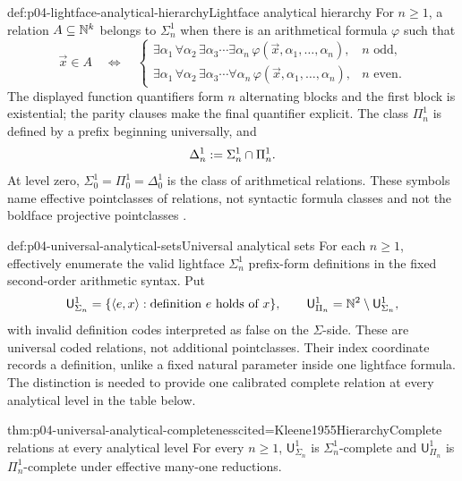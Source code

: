 \begin{hbdefinition}{def:p04-lightface-analytical-hierarchy}{Lightface analytical hierarchy}
For \(n\geq1\), a relation \(A\subseteq\mathbb{N}^k\) belongs to
\(\Sigma^1_n\) when there is an arithmetical formula \(\varphi\) such that
\[
 \vec x\in A\quad\Leftrightarrow\quad
 \begin{cases}
  \exists\alpha_1\,\forall\alpha_2\,\exists\alpha_3\cdots
    \exists\alpha_n\,\varphi(\vec x,\alpha_1,\ldots,\alpha_n),
       & n\text{ odd},\\
  \exists\alpha_1\,\forall\alpha_2\,\exists\alpha_3\cdots
    \forall\alpha_n\,\varphi(\vec x,\alpha_1,\ldots,\alpha_n),
       & n\text{ even}.
 \end{cases}
\]
The displayed function quantifiers form \(n\) alternating blocks and the first
block is existential; the parity clauses make the final quantifier explicit.
The class \(\Pi^1_n\) is defined by a prefix
beginning universally, and
\[
 \Delta^1_n\mathrel{:=}\Sigma^1_n\cap\Pi^1_n.
\]
At level zero, \(\Sigma^1_0=\Pi^1_0=\Delta^1_0\) is the class of
arithmetical relations.  These symbols name effective pointclasses of
relations, not syntactic formula classes and not the boldface projective
pointclasses \cite{Kleene1955Hierarchy,Moschovakis2016Hyperarithmetical}.
\end{hbdefinition}

\begin{hbdefinition}{def:p04-universal-analytical-sets}{Universal analytical sets}
For each \(n\geq1\), effectively enumerate the valid lightface
\(\Sigma^1_n\) prefix-form definitions in the fixed second-order arithmetic
syntax.  Put
\[
 \mathsf U^1_{\Sigma_n}
 =\{\langle e,x\rangle:\text{definition }e\text{ holds of }x\},
 \qquad
 \mathsf U^1_{\Pi_n}=\mathbb{N}^2\setminus\mathsf U^1_{\Sigma_n},
\]
with invalid definition codes interpreted as false on the \(\Sigma\)-side.
These are universal coded relations, not additional pointclasses.  Their index
coordinate records a definition, unlike a fixed natural parameter inside one
lightface formula.  The distinction is needed to provide one calibrated
complete relation at every analytical level in the table below.
\end{hbdefinition}

\begin{hbtheorem}{thm:p04-universal-analytical-completeness}{cited=Kleene1955Hierarchy}{Complete relations at every analytical level}
For every \(n\geq1\), \(\mathsf U^1_{\Sigma_n}\) is
\(\Sigma^1_n\)-complete and \(\mathsf U^1_{\Pi_n}\) is
\(\Pi^1_n\)-complete under effective many-one reductions.
\end{hbtheorem}

